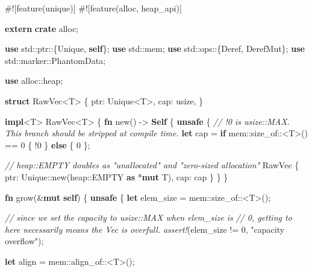 \documentclass[a4paper,]{book}
\newenvironment{Shaded}{\begin{snugshade}}{\end{snugshade}}
\newcommand{\KeywordTok}[1]{\textcolor[rgb]{0.13,0.29,0.53}{\textbf{{#1}}}}
\newcommand{\DataTypeTok}[1]{\textcolor[rgb]{0.13,0.29,0.53}{{#1}}}
\newcommand{\DecValTok}[1]{\textcolor[rgb]{0.00,0.00,0.81}{{#1}}}
\newcommand{\StringTok}[1]{\textcolor[rgb]{0.31,0.60,0.02}{{#1}}}
\newcommand{\CommentTok}[1]{\textcolor[rgb]{0.56,0.35,0.01}{\textit{{#1}}}}
\newcommand{\PreprocessorTok}[1]{\textcolor[rgb]{0.56,0.35,0.01}{\textit{{#1}}}}
\newcommand{\AttributeTok}[1]{\textcolor[rgb]{0.77,0.63,0.00}{{#1}}}
\newcommand{\NormalTok}[1]{{#1}}
\begin{document}
\begin{Shaded}
\begin{Highlighting}[]
\AttributeTok{#![}\NormalTok{feature}\AttributeTok{(}\NormalTok{unique}\AttributeTok{)]}
\AttributeTok{#![}\NormalTok{feature}\AttributeTok{(}\NormalTok{alloc}\AttributeTok{,} \NormalTok{heap_api}\AttributeTok{)]}

\KeywordTok{extern} \KeywordTok{crate} \NormalTok{alloc;}

\KeywordTok{use} \NormalTok{std::ptr::\{Unique, }\KeywordTok{self}\NormalTok{\};}
\KeywordTok{use} \NormalTok{std::mem;}
\KeywordTok{use} \NormalTok{std::ops::\{Deref, DerefMut\};}
\KeywordTok{use} \NormalTok{std::marker::PhantomData;}

\KeywordTok{use} \NormalTok{alloc::heap;}

\KeywordTok{struct} \NormalTok{RawVec<T> \{}
    \NormalTok{ptr: Unique<T>,}
    \NormalTok{cap: }\DataTypeTok{usize}\NormalTok{,}
\NormalTok{\}}

\KeywordTok{impl}\NormalTok{<T> RawVec<T> \{}
    \KeywordTok{fn} \NormalTok{new() -> }\KeywordTok{Self} \NormalTok{\{}
        \KeywordTok{unsafe} \NormalTok{\{}
            \CommentTok{// !0 is usize::MAX. This branch should be stripped at compile time.}
            \KeywordTok{let} \NormalTok{cap = }\KeywordTok{if} \NormalTok{mem::size_of::<T>() == }\DecValTok{0} \NormalTok{\{ !}\DecValTok{0} \NormalTok{\} }\KeywordTok{else} \NormalTok{\{ }\DecValTok{0} \NormalTok{\};}

            \CommentTok{// heap::EMPTY doubles as "unallocated" and "zero-sized allocation"}
            \NormalTok{RawVec \{ ptr: Unique::new(heap::EMPTY }\KeywordTok{as} \NormalTok{*}\KeywordTok{mut} \NormalTok{T), cap: cap \}}
        \NormalTok{\}}
    \NormalTok{\}}

    \KeywordTok{fn} \NormalTok{grow(&}\KeywordTok{mut} \KeywordTok{self}\NormalTok{) \{}
        \KeywordTok{unsafe} \NormalTok{\{}
            \KeywordTok{let} \NormalTok{elem_size = mem::size_of::<T>();}

            \CommentTok{// since we set the capacity to usize::MAX when elem_size is}
            \CommentTok{// 0, getting to here necessarily means the Vec is overfull.}
            \PreprocessorTok{assert!}\NormalTok{(elem_size != }\DecValTok{0}\NormalTok{, }\StringTok{"capacity overflow"}\NormalTok{);}

            \KeywordTok{let} \NormalTok{align = mem::align_of::<T>();}


\end{Highlighting}
\end{Shaded}
\end{document}

